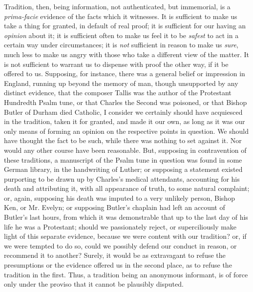 Tradition, then, being information, not authenticated,
but immemorial, is a \emph{prima-facie} evidence of the
facts which it witnesses. It is sufficient to make us
take a thing for granted, in default of real proof; it is
sufficient for our having an \emph{opinion} about it;
it is sufficient often to make us feel it to be \emph{safest}
to act in a certain way under circumstances; it is \emph{not}
sufficient in reason to make us \emph{sure}, much less
to make us angry with those who take a different view of
the matter. It is not sufficient to warrant us to
dispense with proof the other way, if it be offered to
us. Supposing, for instance, there was a general belief
or impression in England, running up beyond the memory of
man, though unsupported by any distinct evidence, that
the composer Tallis was the author of the Protestant
Hundredth Psalm tune, or that Charles the Second was
poisoned, or that Bishop Butler of Durham died Catholic,
I consider we certainly should have acquiesced in the
tradition, taken it for granted, and made it our own, as
long as it was our only means of forming an opinion on
the respective points in question. We should have thought
the fact to be such, while there was nothing to set
against it. Nor would any other course have been
reasonable. But, supposing in contravention of these
traditions, a manuscript of the Psalm tune in question
was found in some German library, in the handwriting of
Luther; or supposing a statement existed purporting to be
drawn up by Charles's medical attendants, accounting for
his death and attributing it, with all appearance of
truth, to some natural complaint; or, again, supposing
his death was imputed to a very unlikely person, Bishop
Ken, or Mr. Evelyn; or supposing Butler's chaplain had
left an account of Butler's last hours, from which it was
demonstrable that up to the last day of his life he was a
Protestant; should we passionately reject, or
superciliously make light of this separate evidence,
because we were content with our tradition? or, if we
were tempted to do so, could we possibly defend our
conduct in reason, or recommend it to another? Surely, it
would be as extravagant to refuse the presumptions or the
evidence offered us in the second place, as to refuse the
tradition in the first. Thus, a tradition being an
anonymous informant, is of force only under the proviso
that it cannot be plausibly disputed.

